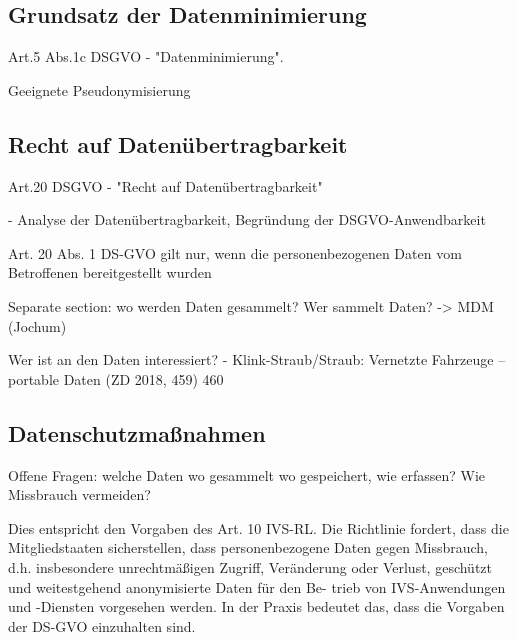 \subsection{Grundsatz der Datenminimierung}

Art.5 Abs.1c DSGVO - "Datenminimierung". 

Geeignete Pseudonymisierung

\subsection{Recht auf Datenübertragbarkeit}

Art.20 DSGVO - "Recht auf Datenübertragbarkeit"

\cite{Straub2018} - Analyse der Datenübertragbarkeit, Begründung der DSGVO-Anwendbarkeit

Art. 20 Abs. 1 DS-GVO gilt nur, wenn die personenbezogenen Daten vom Betroffenen bereitgestellt wurden

Separate section: wo werden Daten gesammelt? Wer sammelt Daten? 
-> MDM (Jochum)

Wer ist an den Daten interessiert? - Klink-Straub/Straub: Vernetzte Fahrzeuge – portable Daten (ZD 2018, 459) 460


\subsection{Datenschutzmaßnahmen}

Offene Fragen: welche Daten wo gesammelt wo gespeichert, wie erfassen? Wie Missbrauch vermeiden?

Dies entspricht den Vorgaben des Art. 10 IVS-RL. Die Richtlinie fordert, dass die Mitgliedstaaten sicherstellen, dass personenbezogene Daten gegen Missbrauch, d.h. insbesondere unrechtmäßigen Zugriff, Veränderung oder Verlust, geschützt und weitestgehend anonymisierte Daten für den Be- trieb von IVS-Anwendungen und -Diensten vorgesehen werden. In der Praxis bedeutet das, dass die Vorgaben der DS-GVO einzuhalten sind. 

